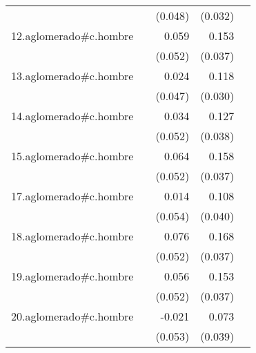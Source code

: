 {\begin{longtable}{l*{4}{D{.}{.}{-1}}}
            &                     &     (0.048)         &     (0.032)         &                     \\
\addlinespace
12.aglomerado#c.hombre&                     &       0.059         &       0.153\sym{***}&                     \\
            &                     &     (0.052)         &     (0.037)         &                     \\
\addlinespace
13.aglomerado#c.hombre&                     &       0.024         &       0.118\sym{***}&                     \\
            &                     &     (0.047)         &     (0.030)         &                     \\
\addlinespace
14.aglomerado#c.hombre&                     &       0.034         &       0.127\sym{***}&                     \\
            &                     &     (0.052)         &     (0.038)         &                     \\
\addlinespace
15.aglomerado#c.hombre&                     &       0.064         &       0.158\sym{***}&                     \\
            &                     &     (0.052)         &     (0.037)         &                     \\
\addlinespace
17.aglomerado#c.hombre&                     &       0.014         &       0.108\sym{**} &                     \\
            &                     &     (0.054)         &     (0.040)         &                     \\
\addlinespace
18.aglomerado#c.hombre&                     &       0.076         &       0.168\sym{***}&                     \\
            &                     &     (0.052)         &     (0.037)         &                     \\
\addlinespace
19.aglomerado#c.hombre&                     &       0.056         &       0.153\sym{***}&                     \\
            &                     &     (0.052)         &     (0.037)         &                     \\
\addlinespace
20.aglomerado#c.hombre&                     &      -0.021         &       0.073         &                     \\
            &                     &     (0.053)         &     (0.039)         &                     \\

\end{longtable}}

